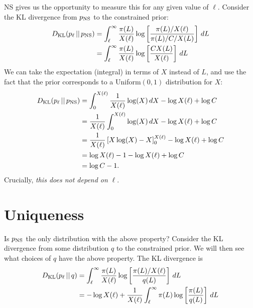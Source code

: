 \documentclass[a4paper, 12pt]{article}
\begin{document}
NS gives us the opportunity to measure this for any given
value of $\ell$. Consider the KL divergence from $p_{\rm NS}$ to
the constrained prior:
\begin{align}
D_{\rm KL}(p_\ell \,||\, p_{\rm NS})
  &= \int_{\ell}^{\infty} \frac{\pi(L)}{X(\ell)}
           \log\left[\frac{\pi(L)/X(\ell)}{\pi(L)/C/X(L)}\right] \, dL \\
  &= \int_{\ell}^{\infty} \frac{\pi(L)}{X(\ell)}
           \log\left[\frac{CX(L)}{X(\ell)}\right] \, dL
\end{align}
We can take the expectation (integral) in terms of $X$ instead of
$L$, and use the fact that the prior corresponds to a
Uniform$(0,1)$ distribution for $X$:
\begin{align}
D_{\rm KL}(p_\ell \,||\, p_{\rm NS})
    &= \int_0^{X(\ell)} \frac{1}{X(\ell)}
           \log(X) \, dX - \log X(\ell) + \log C \\
    &= \frac{1}{X(\ell)} \int_0^{X(\ell)} \log(X) \, dX
           - \log X(\ell) + \log C \\
    &= \frac{1}{X(\ell)}\left[X\log(X) - X\right]_0^{X(\ell)}
           - \log X(\ell) + \log C \\
    &= \log X(\ell) - 1 - \log X(\ell) + \log C \\
    &= \log C - 1.
\end{align}
Crucially, {\em this does not depend on} $\ell$.

\section{Uniqueness}
Is $p_{\rm NS}$ the only distribution with the above property?
Consider the KL divergence from some distribution $q$
to the constrained prior.
We will then see what choices of $q$ have the above property.
The KL divergence is
\begin{align}
D_{\rm KL}(p_\ell \,||\, q)
  &= \int_{\ell}^{\infty} \frac{\pi(L)}{X(\ell)}
           \log\left[\frac{\pi(L)/X(\ell)}{q(L)}\right] \, dL \\
  &= -\log X(\ell) + \frac{1}{X(\ell)}
    \int_{\ell}^{\infty} \pi(L)
               \log\left[\frac{\pi(L)}{q(L)}\right] \, dL
\end{align}
\end{document}
